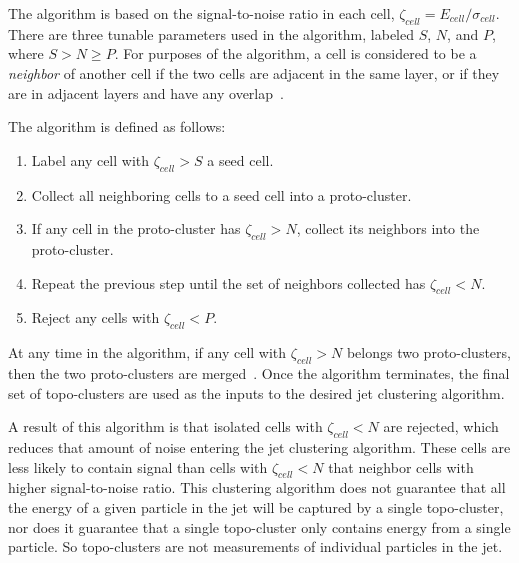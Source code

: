 The algorithm is based on the signal-to-noise ratio in each cell, $\zeta_{cell} = E_{cell}/\sigma_{cell}$.
There are three tunable parameters used in the algorithm, labeled $S$, $N$, and $P$, where $S > N \geq P$.
For purposes of the algorithm, a cell is considered to be a \textit{neighbor} of another cell if the two cells are
adjacent in the same layer, or if they are in adjacent layers and have any overlap~\cite{jet-topo-cluster}.

The algorithm is defined as follows:
\begin{enumerate}
    \item Label any cell with $\zeta_{cell}>S$ a seed cell.
    \item Collect all neighboring cells to a seed cell into a proto-cluster.
    \item If any cell in the proto-cluster has $\zeta_{cell}>N$, collect its neighbors into the proto-cluster.
    \item Repeat the previous step until the set of neighbors collected has $\zeta_{cell}<N$.
    \item Reject any cells with $\zeta_{cell}<P$.
\end{enumerate}
At any time in the algorithm, if any cell with $\zeta_{cell}>N$ belongs two proto-clusters, then the two proto-clusters are merged~\cite{jet-topo-cluster}.
Once the algorithm terminates, the final set of topo-clusters are used as the inputs to the desired jet clustering algorithm.

A result of this algorithm is that isolated cells with $\zeta_{cell} < N$ are rejected, which reduces that amount of noise entering the jet clustering algorithm.
These cells are less likely to contain signal than cells with $\zeta_{cell}<N$ that neighbor cells with higher signal-to-noise ratio.
This clustering algorithm does not guarantee that all the energy of a given particle in the jet will be captured by a single topo-cluster, nor does it guarantee that a single topo-cluster only contains energy from a single particle.
So topo-clusters are not measurements of individual particles in the jet.

